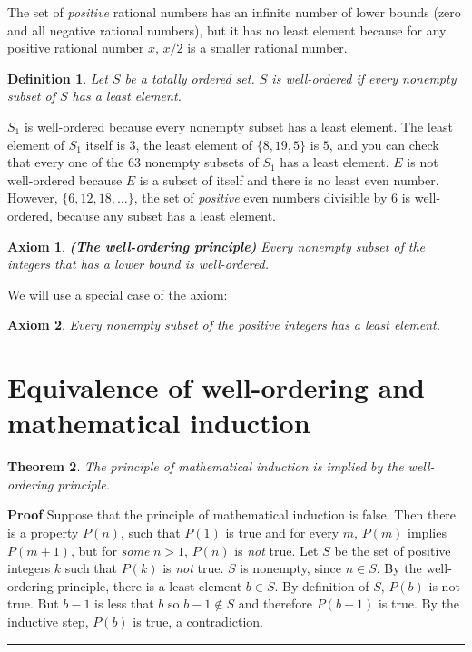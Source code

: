 \documentclass[11pt,a4paper]{report}
\newcommand*{\qed}{\hfill\rule{1ex}{1.5ex}}
\newtheorem{theorem}{Theorem}
\newtheorem{definition}[theorem]{Definition}
\newtheorem{axiom}{Axiom}
\begin{document}
The set of \emph{positive} rational numbers has an infinite number of lower bounds (zero and all negative rational numbers), but it has no least element because for any positive rational number $x$, $x/2$ is a smaller rational number.

\begin{definition} Let $S$ be a totally ordered set. $S$ is \emph{well-ordered} if \emph{every} nonempty subset of $S$ has a least element.
\end{definition}

$S_1$ is well-ordered because every nonempty subset has a least element. The least element of $S_1$ itself is $3$, the least element of $\{8, 19, 5\}$ is $5$, and you can check that every one of the $63$ nonempty subsets of $S_1$ has a least element. $E$ is not well-ordered because $E$ is a subset of itself and there is no least even number. However, $\{6,12,18,\ldots\}$, the set of \emph{positive} even numbers divisible by $6$ is well-ordered, because any subset has a least element.

\begin{axiom} \textbf{(The well-ordering principle)} Every nonempty subset of the integers that has a lower bound is well-ordered.
\end{axiom}

We will use a special case of the axiom:
\begin{axiom} Every nonempty subset of the positive integers has a least element.
\end{axiom}


\section{Equivalence of well-ordering and mathematical induction}

\begin{theorem}\label{th.wop}
The principle of mathematical induction is implied by the well-ordering principle.
\end{theorem}

\textbf{Proof} Suppose that the principle of mathematical induction is false. Then there is a property $P(n)$, such that $P(1)$ is true and for every $m$, $P(m)$ implies $P(m+1)$, but for \emph{some} $n>1$, $P(n)$ is \emph{not} true. Let $S$ be the set of positive integers $k$ such that $P(k)$ is \emph{not} true. $S$ is nonempty, since $n\in S$. By the well-ordering principle, there is a least element $b\in S$. By definition of $S$, $P(b)$ is not true. But $b-1$ is less that $b$ so $b-1\not\in S$ and therefore $P(b-1)$ is true. By the inductive step, $P(b)$ is true, a contradiction.\qed
\end{document}
